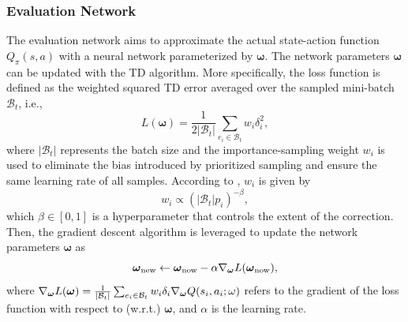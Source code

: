 \documentclass[lettersize,journal]{IEEEtran}
\begin{document}
\subsubsection{Evaluation Network}
The evaluation network aims to approximate the actual state-action function $Q_\pi(s,a)$ with a neural network parameterized by ${\boldsymbol{\omega}}$. The network parameters ${\boldsymbol{\omega}}$ can be updated with the TD algorithm. More specifically, the loss function is defined as the weighted squared TD error averaged over the sampled mini-batch $\mathcal B_t$, i.e.,
\begin{equation}\label{eqn:evaLoss}
L({\boldsymbol{\omega}} ) = \frac{1}{{2|\mathcal{B}_t|}}{\sum\limits_{e_i \in \mathcal B_t}{w_i \delta _i^2}},
\end{equation}
where $|\mathcal{B}_t|$ represents the batch size and the importance-sampling weight $w_i$ is used to eliminate the bias introduced by prioritized sampling and ensure the same learning rate of all samples. According to \cite{schaul2015prioritized}, $w_i$ is given by
\begin{equation}\label{eqn:weight_def}
     w_i \propto {\left(|\mathcal{B}_t| p_i\right)^{-\beta}},
\end{equation}
which $\beta \in [0,1]$ is a hyperparameter that controls the extent of the correction. Then, the gradient descent algorithm is leveraged to update the network parameters  $\boldsymbol{\omega }$ as
\begin{equation}\label{eqn:omega_up}
   \boldsymbol{\omega }_{\rm new} \leftarrow  \boldsymbol{\omega }_{\rm now} - \alpha {\nabla _{\boldsymbol{\omega }}}L({\boldsymbol{\omega }_{\rm now}}),
\end{equation}
where ${\nabla _{\boldsymbol{\omega }}}L({\boldsymbol{\omega }}) = \frac{1}{{|{{\cal B}_t}|}}\sum\nolimits_{{e_i} \in {{\cal B}_t}} {{w_i}{\delta _i}{\nabla _{\bf{\boldsymbol{\omega} }}}Q({s_i},{a_i};{\bf{\omega }})} $ refers to the gradient of the loss function with respect to (w.r.t.) $\boldsymbol{\omega }$, and $\alpha$ is the learning rate.
\end{document}
